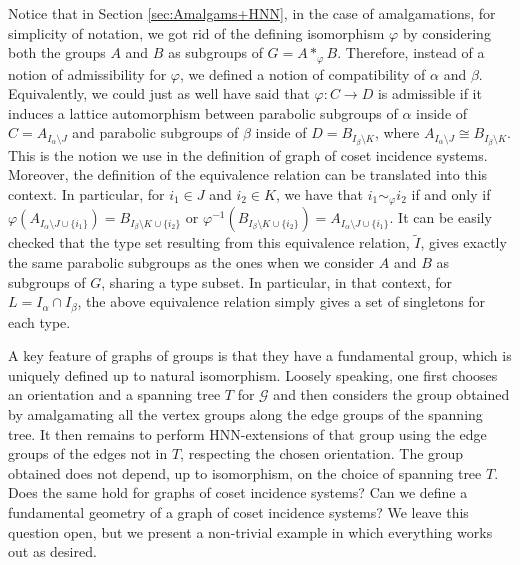 \documentclass[11pt,letterpaper]{amsart}
\begin{document}
Notice that in Section \ref{sec:Amalgams+HNN}, in the case of amalgamations, for simplicity of notation, we got rid of the defining isomorphism $\varphi$ by considering both the groups $A$ and $B$ as subgroups of $G = A *_\varphi B$. Therefore, instead of a notion of admissibility for $\varphi$, we defined a notion of compatibility of $\alpha$ and $\beta$. Equivalently, we could just as well have said that $\varphi: C \to D$ is admissible if it induces a lattice automorphism between parabolic subgroups of $\alpha$ inside of $C=A_{I_\alpha\setminus J}$ and parabolic subgroups of $\beta$ inside of $D=B_{I_\beta\setminus K}$, where $A_{I_\alpha\setminus J}\cong B_{I_\beta\setminus K}$. This is the notion we use in the definition of graph of coset incidence systems.
Moreover, the definition of the equivalence relation can be translated into this context. In particular, for $i_1\in J$ and $i_2\in K$, we have that $i_1\sim_\varphi i_2$ if and only if $\varphi(A_{I_\alpha\setminus J \cup \{i_1\}})=B_{I_\beta\setminus K \cup \{i_2\}}$ or  $\varphi^{-1}(B_{I_\beta\setminus K \cup \{i_2\}}) = A_{I_\alpha\setminus J \cup \{i_1\}}$. It can be easily checked that the type set resulting from this equivalence relation, $\widetilde{I}$, gives exactly the same parabolic subgroups as the ones when we consider $A$ and $B$ as subgroups of $G$, sharing a type subset. In particular, in that context, for $L=I_\alpha\cap I_\beta$, the above equivalence relation simply gives a set of singletons for each type.

A key feature of graphs of groups is that they have a fundamental group, which is uniquely defined up to natural isomorphism. Loosely speaking, one first chooses an orientation and a spanning tree $T$ for $\mathcal{G}$ and then considers the group obtained by amalgamating all the vertex groups along the edge groups of the spanning tree. It then remains to perform HNN-extensions of that group using the edge groups of the edges not in $T$, respecting the chosen orientation. The group obtained does not depend, up to isomorphism, on the choice of spanning tree $T$. Does the same hold for graphs of coset incidence systems? Can we define a fundamental geometry of a graph of coset incidence systems? We leave this question open, but we present a non-trivial example in which everything works out as desired.
\end{document}
